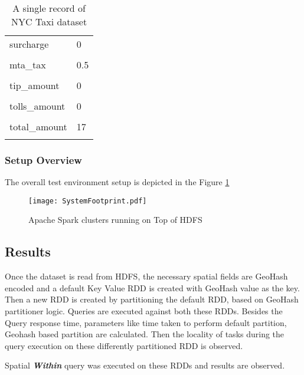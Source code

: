 \documentclass[article,type=msc,colorback,12pt,accentcolor=tud1d]{tudthesis}
\begin{document}
\begin{table}[h]
\begin{tabular}{ll}
		  		    		surcharge & 0     \\ \\[-1em]
		  		    		mta\_tax & 0.5     \\ \\[-1em]
		  		    		tip\_amount & 0     \\ \\[-1em]
		  		    		tolls\_amount & 0     \\ \\[-1em]
		  		    		total\_amount & 17     \\ \\[-1em] 
		  		    	\end{tabular}
		  		    	\caption{A single record of NYC Taxi dataset}
		  		    	\label{nyctaxidatarec}
		  		    \end{table}
			  
			  
			  
		  \clearpage
		  
		  \subsubsection{Setup Overview}
		  
		  The overall test environment setup is depicted in the Figure \ref{fig:system-footprint}
		  
				\begin{figure}[h]
				\centering
				\texttt{[image: SystemFootprint.pdf]}
				\caption{Apache Spark clusters running on Top of HDFS}
				\label{fig:system-footprint}
				\end{figure}
		  
		  
		  \hfill
		  \clearpage
		  \subsection{Results}

		  Once the dataset is read from HDFS, the necessary spatial fields are GeoHash encoded and a default Key Value RDD is created with GeoHash value as the key. Then a new RDD is created by partitioning the default RDD, based on GeoHash partitioner logic. Queries are executed against both these RDDs. Besides the Query response time, parameters like time taken to perform default partition, Geohash based partition are calculated. Then the locality of tasks during the query execution on these differently partitioned RDD is observed.
		  
		  Spatial \textbf{\textit{Within}} query was executed on these RDDs and results are observed. 
		  
\end{document}
